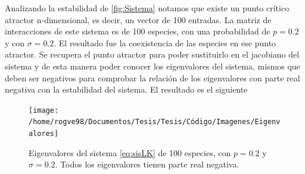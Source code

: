 \documentclass[11pt,a4paper]{article}
\begin{document}
Analizando la estabilidad de \ref{fig:Sistema} notamos que existe un punto crítico atractor n-dimensional, es decir, un vector de 100 entradas. La matriz de interacciones de este sistema es de 100 especies, con una probabilidad de $p=0.2$ y con $\sigma=0.2$. El resultado fue la coexistencia de las especies en ese punto atractor. Se recupera el punto atractor para poder sustituirlo en el jacobiano del sistema y de esta manera poder conocer los eigenvalores del sistema, mismos que deben ser negativos para comprobar la relación de los eigenvalores con parte real negativa con la estabilidad del sistema. El resultado es el siguiente
\begin{figure}[h!]
\centering
\texttt{[image: /home/rogve98/Documentos/Tesis/Tesis/Código/Imagenes/Eigenvalores]}
\caption{Eigenvalores del sistema \ref{eq:sisLK} de 100 especies, con $p=0.2$ y $\sigma=0.2$. Todos los eigenvalores tienen parte real negativa.}
\end{figure}
 
\end{document}
